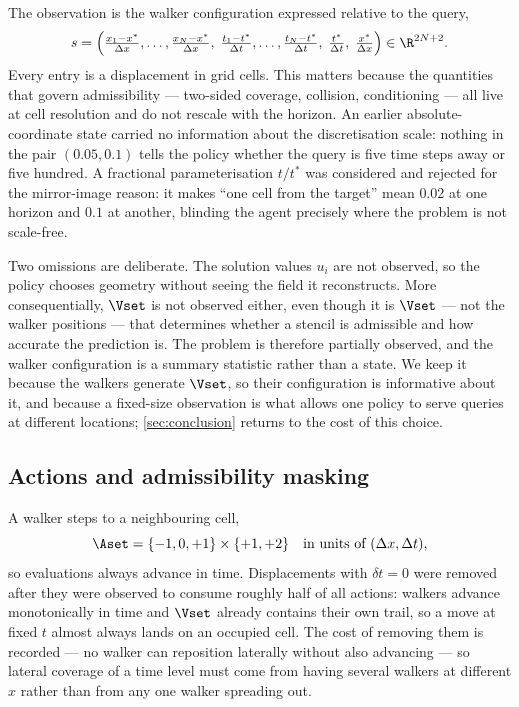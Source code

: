 The observation is the walker configuration expressed relative to the query,
\begin{equation}
  s = \Bigl(\tfrac{x_1 - x^*}{\Delta x}, \ldots, \tfrac{x_N - x^*}{\Delta x},\;
            \tfrac{t_1 - t^*}{\Delta t}, \ldots, \tfrac{t_N - t^*}{\Delta t},\;
            \tfrac{t^*}{\Delta t},\; \tfrac{x^*}{\Delta x} \Bigr)
  \in \R^{2N+2}.
  \label{eq:state}
\end{equation}
Every entry is a displacement in grid cells. This matters because the
quantities that govern admissibility --- two-sided coverage, collision,
conditioning --- all live at cell resolution and do not rescale with the
horizon. An earlier absolute-coordinate state carried no information about
the discretisation scale: nothing in the pair $(0.05, 0.1)$ tells the policy
whether the query is five time steps away or five hundred. A fractional
parameterisation $t/t^*$ was considered and rejected for the mirror-image
reason: it makes ``one cell from the target'' mean $0.02$ at one horizon and
$0.1$ at another, blinding the agent precisely where the problem is not
scale-free.

Two omissions are deliberate. The solution values $u_i$ are not observed, so
the policy chooses geometry without seeing the field it reconstructs. More
consequentially, $\Vset$ is not observed either, even though it is $\Vset$
--- not the walker positions --- that determines whether a stencil is
admissible and how accurate the prediction is. The problem is therefore
partially observed, and the walker configuration is a summary statistic
rather than a state. We keep it because the walkers generate $\Vset$, so
their configuration is informative about it, and because a fixed-size
observation is what allows one policy to serve queries at different
locations; \cref{sec:conclusion} returns to the cost of this choice.

\subsection{Actions and admissibility masking}
\label{sec:mdp_action}

A walker steps to a neighbouring cell,
\begin{equation}
  \Aset = \{-1, 0, +1\} \times \{+1, +2\}
  \quad\text{in units of } (\Delta x, \Delta t),
  \label{eq:actions}
\end{equation}
so evaluations always advance in time. Displacements with $\delta t = 0$ were
removed after they were observed to consume roughly half of all actions:
walkers advance monotonically in time and $\Vset$ already contains their own
trail, so a move at fixed $t$ almost always lands on an occupied cell. The
cost of removing them is recorded --- no walker can reposition laterally
without also advancing --- so lateral coverage of a time level must come
from having several walkers at different $x$ rather than from any one walker
spreading out.

